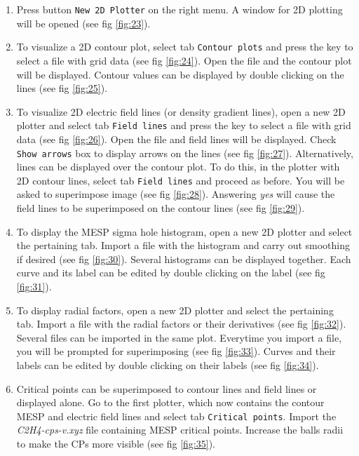 \documentclass[a4paper,10pt]{article}
\begin{document}
\begin{enumerate}
\item Press button \texttt{New 2D Plotter} on the right menu. A window for 2D plotting
will be opened (see fig \ref{fig:23}).

\item To visualize a 2D contour plot, select tab \texttt{Contour plots} and
press the \teclapuntos key to select a file with grid data
(see fig \ref{fig:24}). Open the file and the contour plot will be displayed.
Contour values can be displayed by double clicking on the lines
(see fig \ref{fig:25}).

\item To visualize 2D electric field lines (or density gradient lines), open a new
2D plotter and select tab \texttt{Field lines} and press the \teclapuntos key to select a file 
with grid data (see fig \ref{fig:26}). Open the file and field lines will be displayed.
Check \texttt{Show arrows} box to display arrows on the lines (see fig \ref{fig:27}).
Alternatively, lines can be displayed over the contour plot. To do this, in the plotter
with 2D contour lines, select tab \texttt{Field lines} and proceed as before.
You will be asked to superimpose image (see fig \ref{fig:28}). 
Answering {\it yes} will cause the field lines to be superimposed on the contour 
lines (see fig \ref{fig:29}).

\item To display the MESP sigma hole histogram, open a new 2D plotter
and select the pertaining tab. Import a file with the histogram and carry out 
smoothing if desired (see fig \ref{fig:30}). Several histograms can be 
displayed together. Each curve and its label can be edited by double clicking
on the label (see fig \ref{fig:31}).

\item To display radial factors, open a new 2D plotter and select the 
pertaining tab. Import a file with the radial factors or their derivatives 
(see fig \ref{fig:32}). Several files can be imported in the same plot.
Everytime you import a file, you will be prompted for superimposing
(see fig \ref{fig:33}). Curves and their labels can be edited by 
double clicking on their labels (see fig \ref{fig:34}).

\item Critical points can be superimposed to contour lines and field lines or displayed
alone. Go to the first plotter, which now contains the contour MESP 
and electric field lines and select tab \texttt{Critical points}. Import
the {\it C2H4-cps-v.xyz} file containing MESP critical points.
Increase the balls radii to make the CPs more visible (see fig \ref{fig:35}).


\end{enumerate}
\end{document}
